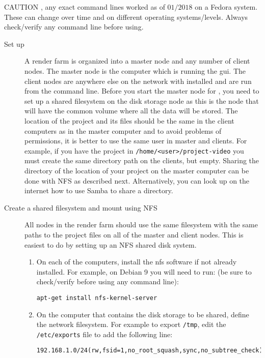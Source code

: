 {\color{red} CAUTION }, any exact command lines worked as of
$01/2018$ on a Fedora system.  These can change over time and on
different operating systems/levels.  Always check/verify any command
line before using.

\begin{description}
\item[Set up \CGG{}] A \CGG{} render farm is organized into a master
  node and any number of client nodes.  The master node is the
  computer which is running the gui.  The client nodes are anywhere
  else on the network with \CGG{} installed and are run from the
  command line.  Before you start the master node for \CGG{}, you need
  to set up a shared filesystem on the disk storage node as this is
  the node that will have the common volume where all the data will be
  stored.  The location of the project and its files should be the
  same in the client computers as in the master computer and to avoid
  problems of permissions, it is better to use the same user in master
  and clients.  For example, if you have the project in
  \texttt{/home/<user>/project-video} you must create the same
  directory path on the clients, but empty.  Sharing the directory of
  the location of your project on the master computer can be done with
  NFS as described next.  Alternatively, you can look up on the
  internet how to use Samba to share a directory.
\item[Create a shared filesystem and mount using NFS] All nodes in
  the render farm should use the same filesystem with the same paths
  to the project files on all of the master and client nodes.  This is
  easiest to do by setting up an NFS shared disk system.
  \begin{enumerate}
  \item On each of the computers, install the nfs software if not
    already installed.  For example, on Debian 9 you will need to run:
    (be sure to check/verify before using any command line):
\begin{lstlisting}[style=sh]
apt-get install nfs-kernel-server
\end{lstlisting}
  \item On the computer that contains the disk storage to be shared,
    define the network filesystem.  For example to export \texttt{/tmp},
    edit the \texttt{/etc/exports} file to add the following line:
\begin{lstlisting}[style=sh]
 192.168.1.0/24(rw,fsid=1,no_root_squash,sync,no_subtree_check)
\end{lstlisting}

\end{enumerate}
\end{description}
